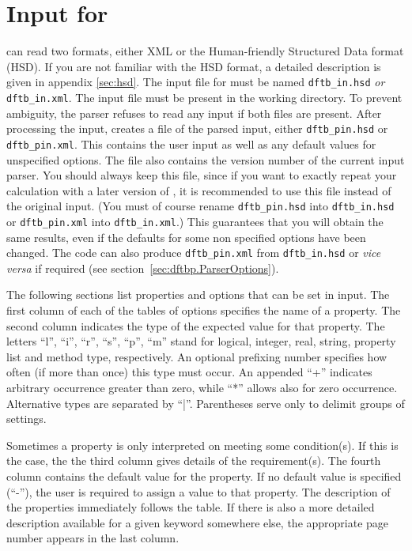 \chapter{Input for {\dftbp}}


{\dftbp} can read two formats, either XML or the Human-friendly
Structured Data format (HSD).  If you are not familiar with the HSD
format, a detailed description is given in appendix \ref{sec:hsd}. The
input file for {\dftbp} must be named \verb|dftb_in.hsd| {\em or}
\verb|dftb_in.xml|. The input file must be present in the working
directory. To prevent ambiguity, the parser refuses to read any input
if both files are present. After processing the input, {\dftbp}
creates a file of the parsed input, either \verb|dftb_pin.hsd| or
\verb|dftb_pin.xml|. This contains the user input as well as any
default values for unspecified options.  The file also contains the
version number of the current input parser.  You should always keep
this file, since if you want to exactly repeat your calculation with a
later version of \dftbp{}, it is recommended to use this file instead
of the original input. (You must of course rename \verb|dftb_pin.hsd|
into \verb|dftb_in.hsd| or \verb|dftb_pin.xml| into
\verb|dftb_in.xml|.)  This guarantees that you will obtain the same
results, even if the defaults for some non specified options have been
changed. The code can also produce \verb|dftb_pin.xml| from
\verb|dftb_in.hsd| or {\it vice versa} if required (see
section~\ref{sec:dftbp.ParserOptions}).

The following sections list properties and options that can be set in
{\dftbp} input. The first column of each of the tables of options
specifies the name of a property. The second column indicates the type
of the expected value for that property.  The letters ``l'', ``i'',
``r'', ``s'', ``p'', ``m'' stand for logical, integer, real, string,
property list and method type, respectively. An optional prefixing
number specifies how often (if more than once) this type must occur.
An appended ``+'' indicates arbitrary occurrence greater than zero,
while ``*'' allows also for zero occurrence.  Alternative types are
separated by ``|''.  Parentheses serve only to delimit groups of
settings.

Sometimes a property is only interpreted on meeting some condition(s).  If this
is the case, the the third column gives details of the requirement(s). The
fourth column contains the default value for the property.  If no default value
is specified (``-''), the user is required to assign a value to that property.
The description of the properties immediately follows the table.  If there is
also a more detailed description available for a given keyword somewhere else,
the appropriate page number appears in the last column.

